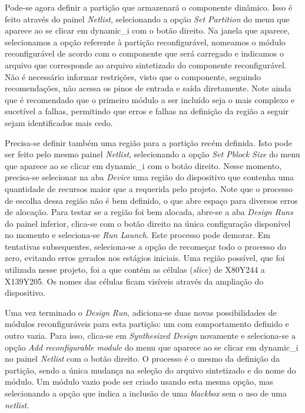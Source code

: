 \documentclass[11pt,a4paper,oneside]{book}
\begin{document}
Pode-se agora definir a partição que armazenará o componente dinâmico.
Isso é feito através do painel \dlq{}\textit{Netlist}\drq{}, selecionando a opção \dlq{}\textit{Set Partition}\drq{} do menu que aparece ao se clicar em \dlq{}dynamic\_i\drq{} com o botão direito.
Na janela que aparece, selecionamos a opção referente à partição reconfigurável, nomeamos o módulo reconfigurável de acordo com o componente que será carregado e indicamos o arquivo que corresponde ao arquivo sintetizado do componente reconfigurável.
Não é necessário informar restrições, visto que o componente, seguindo recomendações, não acessa os pinos de entrada e saída diretamente.
Note ainda que é recomendado que o primeiro módulo a ser incluído seja o mais complexo e sucetível a falhas, permitindo que erros e falhas na definição da região a seguir sejam identificados mais cedo.

Precisa-se definir também uma região para a partição recém definida.
Isto pode ser feito pelo mesmo painel \dlq{}\textit{Netlist}\drq{}, selecionando a opção \dlq{}\textit{Set Pblock Size}\drq{} do menu que aparece ao se clicar em \dlq{}dynamic\_i\drq{} com o botão direito.
Nesse momento, precisa-se selecionar na aba \dlq{}\textit{Device}\drq{} uma região do dispositivo que contenha uma quantidade de recursos maior que a requerida pelo projeto.
Note que o processo de escolha dessa região não é bem definido, o que abre espaço para diversos erros de alocação.
Para testar se a região foi bem alocada, abre-se a aba \dlq{}\textit{Design Runs}\drq{} do painel inferior, clica-se com o botão direito na única configuração disponível no momento e seleciona-se \dlq{}\textit{Run Launch}\drq{}.
Este processo pode demorar.
Em tentativas subsequentes, seleciona-se a opção de recomeçar todo o processo do zero, evitando erros gerados nos estágios iniciais.
Uma região possível, que foi utilizada nesse projeto, foi a que contém as células (\textit{slice}) de X80Y244 a X139Y205.
Os nomes das células ficam visíveis através da ampliação do dispositivo.

Uma vez terminado o \dlq{}\textit{Design Run}\drq{}, adiciona-se duas novas possibilidades de módulos reconfiguráveis para esta partição: um com comportamento definido e outro vazia.
Para isso, clica-se em \dlq{}\textit{Synthesized Design}\drq{} novamente e seleciona-se a opção \dlq{}\textit{Add reconfigurable module}\drq{} do menu que aparece ao se clicar em \dlq{}dynamic\_i\drq{} no painel \dlq{}\textit{Netlist}\drq{} com o botão direito.
O processo é o mesmo da definição da partição, sendo a única mudança na seleção do arquivo sintetizado e do nome do módulo.
Um módulo vazio pode ser criado usando esta mesma opção, mas selecionando a opção que indica a inclusão de uma \textit{blackbox} sem o uso de uma \textit{netlist}.
\end{document}
